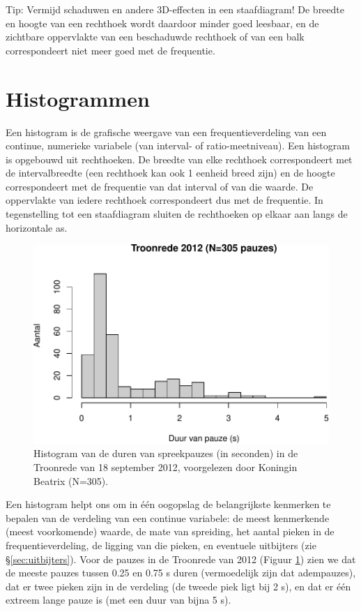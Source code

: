 \documentclass[
]{book}
\begin{document}
Tip: Vermijd schaduwen en andere 3D-effecten in een staafdiagram! De
breedte en hoogte van een rechthoek wordt daardoor minder goed leesbaar,
en de zichtbare oppervlakte van een beschaduwde rechthoek of van een
balk correspondeert niet meer goed met de frequentie.

\hypertarget{sec:histogrammen}{%
\section{Histogrammen}\label{sec:histogrammen}}

Een histogram is de grafische weergave van een frequentieverdeling van
een continue, numerieke variabele (van interval- of ratio-meetniveau).
Een histogram is opgebouwd uit rechthoeken. De breedte van elke
rechthoek correspondeert met de intervalbreedte (een rechthoek kan ook 1
eenheid breed zijn) en de hoogte correspondeert met de frequentie van
dat interval of van die waarde. De oppervlakte van iedere rechthoek
correspondeert dus met de frequentie. In tegenstelling tot een
staafdiagram sluiten de rechthoeken op elkaar aan langs de horizontale
as.

\begin{figure}
\centering
\includegraphics{MS1NL-boek_files/figure-latex/troonrede2012-hist-1.pdf}
\caption{\label{fig:troonrede2012-hist}Histogram van de duren van spreekpauzes (in seconden) in de Troonrede van 18 september 2012, voorgelezen door Koningin Beatrix (N=305).}
\end{figure}

Een histogram helpt ons om in één oogopslag de belangrijkste kenmerken
te bepalen van de verdeling van een continue variabele: de meest
kenmerkende (meest voorkomende) waarde, de mate van spreiding, het
aantal pieken in de frequentieverdeling, de ligging van die pieken, en
eventuele uitbijters
(zie §\ref{sec:uitbijters}).
Voor de pauzes in de Troonrede van 2012
(Figuur \ref{fig:troonrede2012-hist}) zien we dat de meeste pauzes
tussen 0.25 en 0.75 s duren (vermoedelijk zijn dat adempauzes), dat er
twee pieken zijn in de verdeling (de tweede piek ligt bij 2 s),
en dat er één extreem lange pauze is (met een duur van bijna 5 s).
\end{document}
